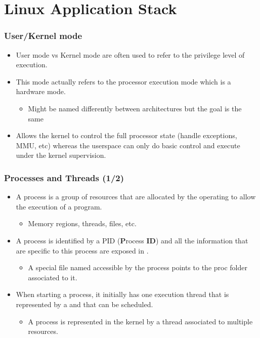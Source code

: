 \section{Linux Application Stack}

\begin{frame}
  \frametitle{User/Kernel mode}
  \begin{itemize}
    \item User mode vs Kernel mode are often used to refer to the privilege
          level of execution.
    \item This mode actually refers to the processor execution mode which is a
          hardware mode.
    \begin{itemize}
      \item Might be named differently between architectures but the goal is
            the same
    \end{itemize}
    \item Allows the kernel to control the full processor state (handle
      exceptions, MMU, etc) whereas the userspace can only do basic control
          and execute under the kernel supervision.
  \end{itemize}
\end{frame}

\begin{frame}
  \frametitle{Processes and Threads (1/2)}
  \begin{itemize}
    \item A process is a group of resources that are allocated by the operating
          to allow the execution of a program.
    \begin{itemize}
      \item Memory regions, threads, files, etc.
    \end{itemize}
    \item A process is identified by a PID ({\bf P}rocess {\bf ID}) and all the
          information that are specific to this process are exposed in
          .
    \begin{itemize}
      \item A special file named  accessible by the process
            points to the proc folder associated to it.
    \end{itemize}
    \item When starting a process, it initially has one execution thread that
          is represented by a  and that can be scheduled.
    \begin{itemize}
      \item A process is represented in the kernel by a thread associated to
            multiple resources.
    \end{itemize}
  \end{itemize}
\end{frame}

